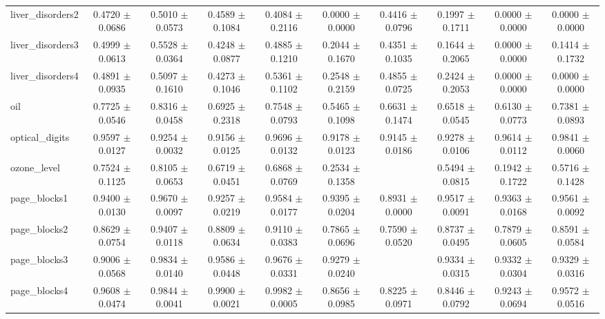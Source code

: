 \begin{table*}[htbp]
\begin{tabular}{lccccccccc}
            liver\_disorders2 & 0.4720 $\pm$ 0.0686 & 0.5010 $\pm$ 0.0573 & 0.4589 $\pm$ 0.1084 & 0.4084 $\pm$ 0.2116 & 0.0000 $\pm$ 0.0000 & 0.4416 $\pm$ 0.0796 & 0.1997 $\pm$ 0.1711 & 0.0000 $\pm$ 0.0000 & 0.0000 $\pm$ 0.0000 \\ 
            liver\_disorders3 & 0.4999 $\pm$ 0.0613 & 0.5528 $\pm$ 0.0364 & 0.4248 $\pm$ 0.0877 & 0.4885 $\pm$ 0.1210 & 0.2044 $\pm$ 0.1670 & 0.4351 $\pm$ 0.1035 & 0.1644 $\pm$ 0.2065 & 0.0000 $\pm$ 0.0000 & 0.1414 $\pm$ 0.1732 \\ 
            liver\_disorders4 & 0.4891 $\pm$ 0.0935 & 0.5097 $\pm$ 0.1610 & 0.4273 $\pm$ 0.1046 & 0.5361 $\pm$ 0.1102 & 0.2548 $\pm$ 0.2159 & 0.4855 $\pm$ 0.0725 & 0.2424 $\pm$ 0.2053 & 0.0000 $\pm$ 0.0000 & 0.0000 $\pm$ 0.0000 \\ 
            oil & 0.7725 $\pm$ 0.0546 & 0.8316 $\pm$ 0.0458 & 0.6925 $\pm$ 0.2318 & 0.7548 $\pm$ 0.0793 & 0.5465 $\pm$ 0.1098 & 0.6631 $\pm$ 0.1474 & 0.6518 $\pm$ 0.0545 & 0.6130 $\pm$ 0.0773 & 0.7381 $\pm$ 0.0893 \\ 
            optical\_digits & 0.9597 $\pm$ 0.0127 & 0.9254 $\pm$ 0.0032 & 0.9156 $\pm$ 0.0125 & 0.9696 $\pm$ 0.0132 & 0.9178 $\pm$ 0.0123 & 0.9145 $\pm$ 0.0186 & 0.9278 $\pm$ 0.0106 & 0.9614 $\pm$ 0.0112 & 0.9841 $\pm$ 0.0060 \\ 
            ozone\_level & 0.7524 $\pm$ 0.1125 & 0.8105 $\pm$ 0.0653 & 0.6719 $\pm$ 0.0451 & 0.6868 $\pm$ 0.0769 & 0.2534 $\pm$ 0.1358 &  & 0.5494 $\pm$ 0.0815 & 0.1942 $\pm$ 0.1722 & 0.5716 $\pm$ 0.1428 \\ 
            page\_blocks1 & 0.9400 $\pm$ 0.0130 & 0.9670 $\pm$ 0.0097 & 0.9257 $\pm$ 0.0219 & 0.9584 $\pm$ 0.0177 & 0.9395 $\pm$ 0.0204 & 0.8931 $\pm$ 0.0000 & 0.9517 $\pm$ 0.0091 & 0.9363 $\pm$ 0.0168 & 0.9561 $\pm$ 0.0092 \\ 
            page\_blocks2 & 0.8629 $\pm$ 0.0754 & 0.9407 $\pm$ 0.0118 & 0.8809 $\pm$ 0.0634 & 0.9110 $\pm$ 0.0383 & 0.7865 $\pm$ 0.0696 & 0.7590 $\pm$ 0.0520 & 0.8737 $\pm$ 0.0495 & 0.7879 $\pm$ 0.0605 & 0.8591 $\pm$ 0.0584 \\ 
            page\_blocks3 & 0.9006 $\pm$ 0.0568 & 0.9834 $\pm$ 0.0140 & 0.9586 $\pm$ 0.0448 & 0.9676 $\pm$ 0.0331 & 0.9279 $\pm$ 0.0240 &  & 0.9334 $\pm$ 0.0315 & 0.9332 $\pm$ 0.0304 & 0.9329 $\pm$ 0.0316 \\ 
            page\_blocks4 & 0.9608 $\pm$ 0.0474 & 0.9844 $\pm$ 0.0041 & 0.9900 $\pm$ 0.0021 & 0.9982 $\pm$ 0.0005 & 0.8656 $\pm$ 0.0985 & 0.8225 $\pm$ 0.0971 & 0.8446 $\pm$ 0.0792 & 0.9243 $\pm$ 0.0694 & 0.9572 $\pm$ 0.0516 \\ 

\end{tabular}
\end{table*}

